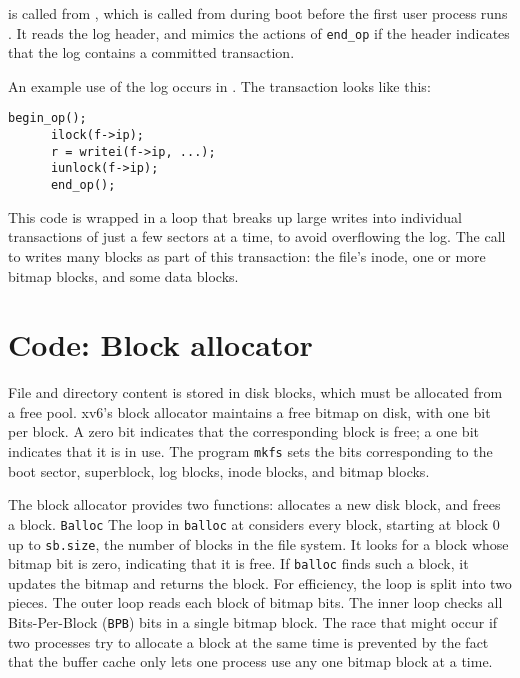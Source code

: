 is called from 
,
which is called from  during boot before the first user process runs
.
It reads the log header, and mimics the actions of
\lstinline{end_op}
if the header indicates that the log contains a committed transaction.

An example use of the log occurs in 
.
The transaction looks like this:
\begin{lstlisting}[]
      begin_op();
      ilock(f->ip);
      r = writei(f->ip, ...);
      iunlock(f->ip);
      end_op();
\end{lstlisting}
This code is wrapped in a loop that breaks up large writes into individual
transactions of just a few sectors at a time, to avoid overflowing
the log.  The call to
writes many blocks as part of this
transaction: the file's inode, one or more bitmap blocks, and some data
blocks.
\section{Code: Block allocator}

File and directory content is stored in disk blocks,
which must be allocated from a free pool.
xv6's block allocator
maintains a free bitmap on disk, with one bit per block. 
A zero bit indicates that the corresponding block is free;
a one bit indicates that it is in use.
The program
\lstinline{mkfs}
sets the bits corresponding to the boot sector, superblock, log blocks, inode
blocks, and bitmap blocks.

The block allocator provides two functions:
allocates a new disk block, and
frees a block.
\lstinline{Balloc}
The loop in
\lstinline{balloc}
at
considers every block, starting at block 0 up to 
\lstinline{sb.size},
the number of blocks in the file system.
It looks for a block whose bitmap bit is zero,
indicating that it is free.
If
\lstinline{balloc}
finds such a block, it updates the bitmap 
and returns the block.
For efficiency, the loop is split into two 
pieces.
The outer loop reads each block of bitmap bits.
The inner loop checks all 
Bits-Per-Block (\lstinline{BPB})
bits in a single bitmap block.
The race that might occur if two processes try to allocate
a block at the same time is prevented by the fact that
the buffer cache only lets one process use any one bitmap block at a time.

